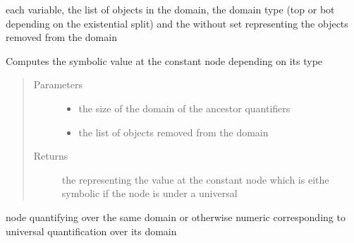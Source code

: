 \documentclass[letterpaper,10pt,english,openany,oneside]{sphinxmanual}
\begin{document}
\begin{fulllineitems}
\begin{fulllineitems}
\begin{quote}
\begin{description}
\begin{itemize}
\end{itemize}

\end{description}\end{quote}

each variable, the list of objects in the domain, the domain type (top or bot depending on the existential split) and the without set 
representing the objects removed from the domain

\end{fulllineitems}


\begin{fulllineitems}
\label{\detokenize{index:circuit.ConstNode.compute}}
Computes the symbolic value at the constant node depending on its type
\begin{quote}\begin{description}
\item[{Parameters}] \leavevmode\begin{itemize}
\item {} 
 \textendash{} the size of the domain of the ancestor quantifiers

\item {} 
 \textendash{} the list of objects removed from the domain

\end{itemize}

\item[{Returns}] \leavevmode
the {\hyperref[\detokenize{index:term.Term}]{}} representing the value at the constant node which is eithe symbolic if the node is under a universal

\end{description}\end{quote}

node quantifying over the same domain or otherwise numeric corresponding to universal quantification over its domain

\end{fulllineitems}



\end{fulllineitems}
\end{document}
